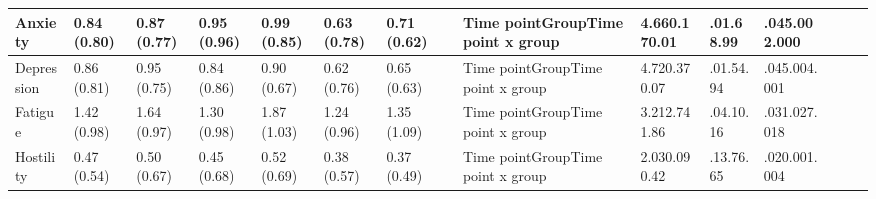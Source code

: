 \documentclass[authordate, empirical]{jote-new-article}
\begin{document}
\begin{table}
\begin{tabularx}{\linewidth}{@{} l l l l l l l l l l l l l l l @{}}
    Anxiety                                        & 0.84 (0.80)                                   & 0.87 (0.77)          & 0.95 (0.96)                       & 0.99 (0.85)                       & 0.63 (0.78)
                                                   & 0.71 (0.62)                                   &                      & Time pointGroupTime point x group & 4.660.170.01                      & .01.68.99
                                                   & .045.002.000                                                                                                                                                                                                        \\

    \hline Depression                              & 0.86 (0.81)                                   & 0.95 (0.75)          & 0.84 (0.86)                       & 0.90 (0.67)                       &
    0.62 (0.76)                                    & 0.65 (0.63)                                   &                      & Time pointGroupTime point x group & 4.720.370.07
                                                   & .01.54.94                                     & .045.004.001                                                                                                                                                        \\

    \hline Fatigue                                 & 1.42 (0.98)                                   & 1.64 (0.97)          & 1.30 (0.98)                       & 1.87 (1.03)                       & 1.24 (0.96)
                                                   & 1.35 (1.09)                                   &                      & Time pointGroupTime point x group & 3.212.741.86                      & .04.10.16
                                                   & .031.027.018                                                                                                                                                                                                        \\

    \hline Hostility                               & 0.47 (0.54)                                   & 0.50 (0.67)          & 0.45 (0.68)                       & 0.52 (0.69)                       &
    0.38 (0.57)                                    & 0.37 (0.49)                                   &                      & Time pointGroupTime point x group & 2.030.090.42
                                                   & .13.76.65                                     & .020.001.004                                                                                                                                                        \\


\end{tabularx}
\end{table}
\end{document}
